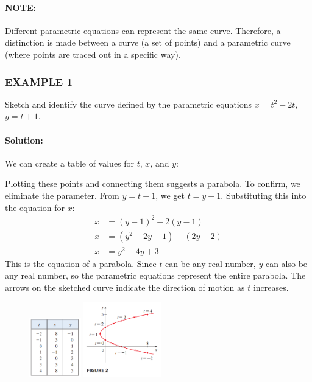 \documentclass{article}
\begin{document}
\paragraph{NOTE:} Different parametric equations can represent the same curve. Therefore, a distinction is made between a curve (a set of points) and a parametric curve (where points are traced out in a specific way).

\subsubsection*{EXAMPLE 1}
Sketch and identify the curve defined by the parametric equations $x = t^2 - 2t$, $y = t + 1$.

\paragraph{Solution:} We can create a table of values for $t$, $x$, and $y$:

Plotting these points and connecting them suggests a parabola. To confirm, we eliminate the parameter. From $y=t+1$, we get $t=y-1$. Substituting this into the equation for $x$:
\begin{align*}
    x &= (y-1)^2 - 2(y-1) \\
    x &= (y^2 - 2y + 1) - (2y - 2) \\
    x &= y^2 - 4y + 3
\end{align*}
This is the equation of a parabola. Since $t$ can be any real number, $y$ can also be any real number, so the parametric equations represent the entire parabola. The arrows on the sketched curve indicate the direction of motion as $t$ increases.
\begin{figure}[htbp]
    \centering
    \includegraphics[width=0.2\textwidth]{graph13.png}
    \includegraphics[width=0.3\textwidth]{graph12.png} %
\end{figure}
\end{document}
